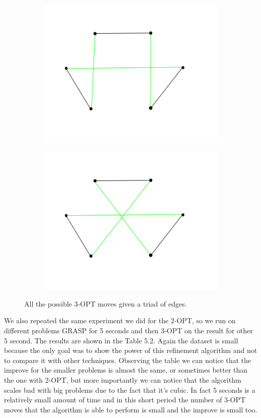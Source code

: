 \begin{figure}[h!]
\begin{subfigure}[b]{0.24\linewidth}
    \includegraphics[width=\linewidth]{media/3opt7.png}
    \caption{}
  \end{subfigure}
  \begin{subfigure}[b]{0.24\linewidth}
    \includegraphics[width=\linewidth]{media/3opt8.png}
    \caption{}
  \end{subfigure}
  \caption{All the possible 3-OPT moves given a triad of edges.}
\end{figure}
 
\noindent We also repeated the same experiment we did for the 2-OPT, so we run on different problems GRASP for 5 seconds and then 3-OPT on the result for other 5 second. The results are shown in the Table 5.2. Again the dataset is small because the only goal was to show the power of this refinement algorithm and not to compare it with other techniques. Observing the table we can notice that the improve for the smaller problems is almost the same, or sometimes better than the one with 2-OPT, but more importantly we can notice that the algorithm scales bad with big problems due to the fact that it's cubic. In fact 5 seconds is a relatively small amount of time and in this short period the number of 3-OPT moves that the algorithm is able to perform is small and the improve is small too.

